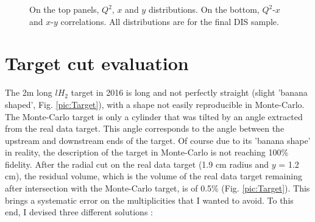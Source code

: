 \begin{figure}[!h]
	\caption{On the top panels, $Q^2$, $x$ and $y$ distributions. On the bottom, $Q^2$-$x$ and $x$-$y$ correlations. All distributions are for the final DIS sample.}
	\label{pic:DISdist}
\end{figure}


\section{Target cut evaluation} \label{sec:targetcut}

The 2m long $lH_2$ target in 2016 is long and not perfectly straight (slight 'banana shaped', Fig. \ref{pic:Target}), with a shape not easily reproducible in Monte-Carlo. The Monte-Carlo target is only a cylinder that was tilted by an angle extracted from the real data target. This angle corresponds to the angle between the upstream and downstream ends of the target. Of course due to its 'banana shape' in reality, the description of the target in Monte-Carlo is not reaching 100\% fidelity. After the radial cut on the real data target (1.9 cm radius and $y$ = 1.2 cm), the residual volume, which is the volume of the real data target remaining after intersection with the Monte-Carlo target, is of 0.5\% (Fig. \ref{pic:Target}). This brings a systematic error on the multiplicities that I wanted to avoid. To this end, I devised three different solutions :

